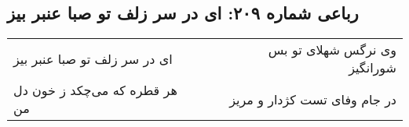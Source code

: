 \begin{center}
\section*{رباعی شماره ۲۰۹: ای در سر زلف تو صبا عنبر بیز}
\label{sec:sh209}
\begin{longtable}{l p{0.5cm} r}
ای در سر زلف تو صبا عنبر بیز
&&
وی نرگس شهلای تو بس شورانگیز
\\
هر قطره که می‌چکد ز خون دل من
&&
در جام وفای تست کژدار و مریز
\\
\end{longtable}
\end{center}
